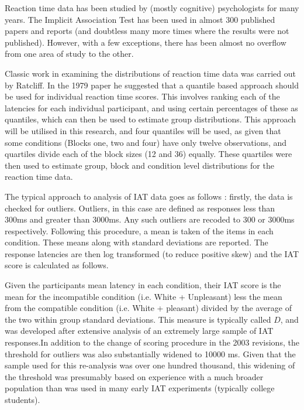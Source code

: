 Reaction time data has been studied by (mostly cognitive) psychologists for many years. The Implicit Association Test has been used in almost 300 published papers and reports (and doubtless many more times where the results were not published). However, with a few exceptions, there has been almost no overflow from one area of study to the other.

Classic work in examining the distributions of reaction time data was carried out by Ratcliff\cite{ratcliff1979group}\cite{ratcliff1993methods}. In the 1979 paper he suggested that a quantile based approach should be used for individual reaction time scores. This involves ranking each of the latencies for each individual participant, and using certain percentages of these as quantiles, which can then be used to estimate group distributions. This approach will be utilised in this research, and four quantiles will be used, as given that some conditions (Blocks one, two and four) have only twelve observations, and quartiles divide each of the block sizes (12 and 36) equally. These quartiles were then used to estimate group, block and condition level distributions for the reaction time data. 

The typical approach to analysis of IAT data goes as follows  \cite{Greenwald1998}: firstly, the data is checked for outliers. Outliers, in this case are defined as responses less than 300ms and greater than 3000ms. Any such outliers are recoded to 300 or 3000ms respectively. Following this procedure, a mean is taken of the items in each condition. These means along with standard deviations are reported. The response latencies are then log transformed (to reduce positive skew) and the IAT score is calculated as follows. 

Given the participants mean latency in each condition, their IAT score is the mean for the incompatible condition (i.e. White + Unpleasant) less the mean from the compatible condition (i.e. White + pleasant) divided by the average of the two within group standard deviations. This measure is typically called $D$, and was developed after extensive analysis of an extremely large sample of IAT responses\cite{Greenwald2003a}.In addition to the change of scoring procedure in the 2003 revisions, the threshold for outliers was also substantially widened to 10000 ms. Given that the sample used for this re-analysis was over one hundred thousand, this widening of the threshold was presumably based on experience with a much broader population than was used in many early IAT experiments (typically college students). 

